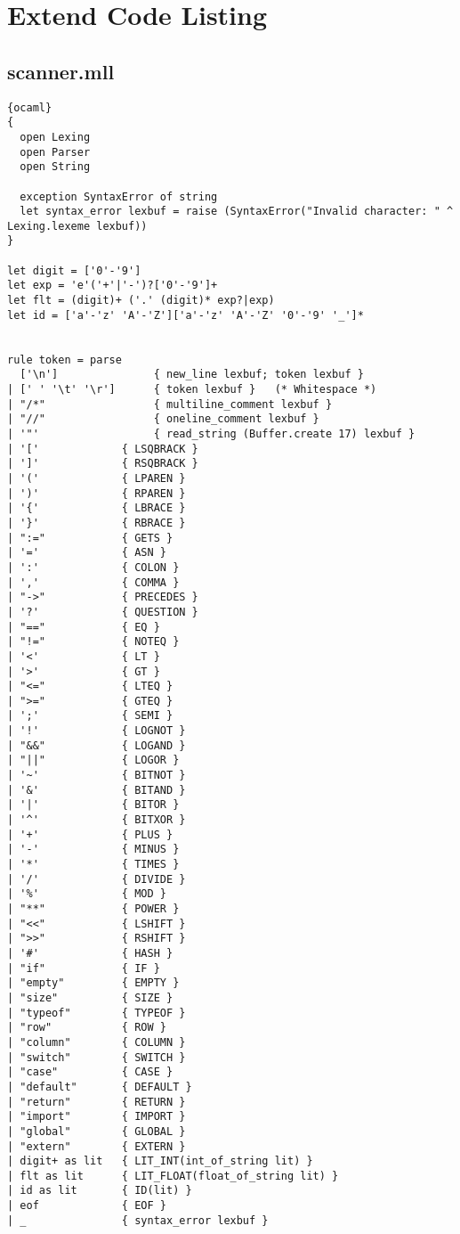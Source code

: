 \chapter{Extend Code Listing}
\section{scanner.mll}
\begin{lstlisting}{ocaml}
{
  open Lexing
  open Parser
  open String

  exception SyntaxError of string
  let syntax_error lexbuf = raise (SyntaxError("Invalid character: " ^ Lexing.lexeme lexbuf))
}

let digit = ['0'-'9']
let exp = 'e'('+'|'-')?['0'-'9']+
let flt = (digit)+ ('.' (digit)* exp?|exp)
let id = ['a'-'z' 'A'-'Z']['a'-'z' 'A'-'Z' '0'-'9' '_']*


rule token = parse
  ['\n']               { new_line lexbuf; token lexbuf }
| [' ' '\t' '\r']      { token lexbuf }   (* Whitespace *)
| "/*"                 { multiline_comment lexbuf }
| "//"                 { oneline_comment lexbuf }
| '"'                  { read_string (Buffer.create 17) lexbuf }
| '['             { LSQBRACK }
| ']'             { RSQBRACK }
| '('             { LPAREN }
| ')'             { RPAREN }
| '{'             { LBRACE }
| '}'             { RBRACE }
| ":="            { GETS }
| '='             { ASN }
| ':'             { COLON }
| ','             { COMMA }
| "->"            { PRECEDES }
| '?'             { QUESTION }
| "=="            { EQ }
| "!="            { NOTEQ }
| '<'             { LT }
| '>'             { GT }
| "<="            { LTEQ }
| ">="            { GTEQ }
| ';'             { SEMI }
| '!'             { LOGNOT }
| "&&"            { LOGAND }
| "||"            { LOGOR }
| '~'             { BITNOT }
| '&'             { BITAND }
| '|'             { BITOR }
| '^'             { BITXOR }
| '+'             { PLUS }
| '-'             { MINUS }
| '*'             { TIMES }
| '/'             { DIVIDE }
| '%'             { MOD }
| "**"            { POWER }
| "<<"            { LSHIFT }
| ">>"            { RSHIFT }
| '#'             { HASH }
| "if"            { IF }
| "empty"         { EMPTY }
| "size"          { SIZE }
| "typeof"        { TYPEOF }
| "row"           { ROW }
| "column"        { COLUMN }
| "switch"        { SWITCH }
| "case"          { CASE }
| "default"       { DEFAULT }
| "return"        { RETURN }
| "import"        { IMPORT }
| "global"        { GLOBAL }
| "extern"        { EXTERN }
| digit+ as lit   { LIT_INT(int_of_string lit) }
| flt as lit      { LIT_FLOAT(float_of_string lit) }
| id as lit       { ID(lit) }
| eof             { EOF }
| _               { syntax_error lexbuf }


\end{lstlisting}
